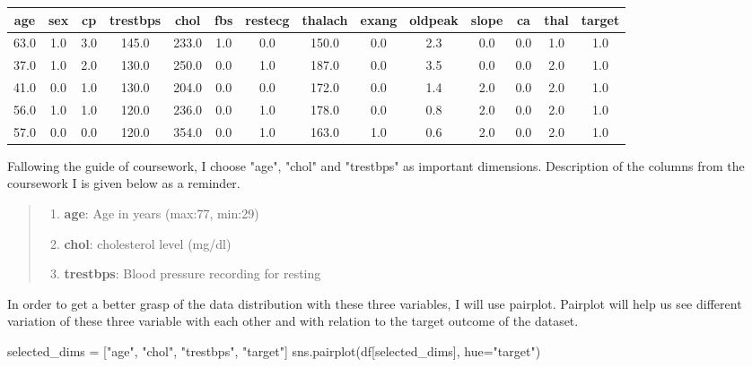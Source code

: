 \documentclass[12pt]{article}
\begin{document}
\begin{table}[h!]
    \centering
     \begin{tabular}{||c c c c c c c c c c c c c c||} 
     \hline
     age & sex & cp & trestbps & chol & fbs &restecg & thalach & exang & oldpeak & slope & ca & thal & target \\ [0.5ex] 
     \hline\hline
     63.0 & 1.0 & 3.0 & 145.0 & 233.0 & 1.0 & 0.0 & 150.0 & 0.0 & 2.3 & 0.0 & 0.0 & 1.0 & 1.0\\ 
     37.0 & 1.0 & 2.0 & 130.0 & 250.0 & 0.0 & 1.0 & 187.0 & 0.0 & 3.5 & 0.0 & 0.0 & 2.0 & 1.0\\
     41.0 & 0.0 & 1.0 & 130.0 & 204.0 & 0.0 & 0.0 & 172.0 & 0.0 & 1.4 & 2.0 & 0.0 & 2.0 & 1.0\\
     56.0 & 1.0 & 1.0 & 120.0 & 236.0 & 0.0 & 1.0 & 178.0 & 0.0 & 0.8 & 2.0 & 0.0 & 2.0 & 1.0\\
     57.0 & 0.0 & 0.0 & 120.0 & 354.0 & 0.0 & 1.0 & 163.0 & 1.0 & 0.6 & 2.0 & 0.0 & 2.0 & 1.0\\ [1ex] 
     \hline
     \end{tabular}
    \end{table}

Fallowing the guide of coursework, I choose "age", "chol" and "trestbps" as important dimensions. Description of the columns from the coursework I is given below as a reminder.

\begin{quote}
    \begin{enumerate}
        \item \textbf{age}: Age in years (max:77, min:29)
        \item \textbf{chol}: cholesterol level (mg/dl)
        \item \textbf{trestbps}: Blood pressure recording for resting
    \end{enumerate}
\end{quote}

In order to get a better grasp of the data distribution with these three variables, I will use pairplot. Pairplot will help us see different variation of these three variable with each other and with relation to the target outcome of the dataset.

\begin{python}
    selected_dims = ["age", "chol", "trestbps", "target"]
    sns.pairplot(df[selected_dims], hue="target")
\end{python}
\end{document}

